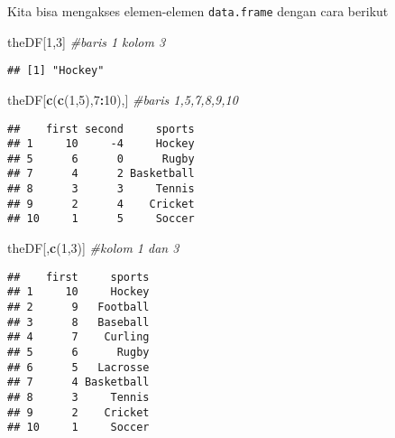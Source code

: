 \documentclass[
]{book}
\newenvironment{Shaded}{\begin{snugshade}}{\end{snugshade}}
\newcommand{\CommentTok}[1]{\textcolor[rgb]{0.56,0.35,0.01}{\textit{#1}}}
\newcommand{\DecValTok}[1]{\textcolor[rgb]{0.00,0.00,0.81}{#1}}
\newcommand{\KeywordTok}[1]{\textcolor[rgb]{0.13,0.29,0.53}{\textbf{#1}}}
\newcommand{\NormalTok}[1]{#1}
\newcommand{\OperatorTok}[1]{\textcolor[rgb]{0.81,0.36,0.00}{\textbf{#1}}}
\begin{document}
Kita bisa mengakses elemen-elemen \texttt{data.frame} dengan cara berikut

\begin{Shaded}
\begin{Highlighting}[]
\NormalTok{theDF[}\DecValTok{1}\NormalTok{,}\DecValTok{3}\NormalTok{] }\CommentTok{\#baris 1 kolom 3}
\end{Highlighting}
\end{Shaded}

\begin{verbatim}
## [1] "Hockey"
\end{verbatim}

\begin{Shaded}
\begin{Highlighting}[]
\NormalTok{theDF[}\KeywordTok{c}\NormalTok{(}\KeywordTok{c}\NormalTok{(}\DecValTok{1}\NormalTok{,}\DecValTok{5}\NormalTok{),}\DecValTok{7}\OperatorTok{:}\DecValTok{10}\NormalTok{),] }\CommentTok{\#baris 1,5,7,8,9,10}
\end{Highlighting}
\end{Shaded}

\begin{verbatim}
##    first second     sports
## 1     10     -4     Hockey
## 5      6      0      Rugby
## 7      4      2 Basketball
## 8      3      3     Tennis
## 9      2      4    Cricket
## 10     1      5     Soccer
\end{verbatim}

\begin{Shaded}
\begin{Highlighting}[]
\NormalTok{theDF[,}\KeywordTok{c}\NormalTok{(}\DecValTok{1}\NormalTok{,}\DecValTok{3}\NormalTok{)] }\CommentTok{\#kolom 1 dan 3}
\end{Highlighting}
\end{Shaded}

\begin{verbatim}
##    first     sports
## 1     10     Hockey
## 2      9   Football
## 3      8   Baseball
## 4      7    Curling
## 5      6      Rugby
## 6      5   Lacrosse
## 7      4 Basketball
## 8      3     Tennis
## 9      2    Cricket
## 10     1     Soccer
\end{verbatim}

\begin{Shaded}
\end{Shaded}
\end{document}
